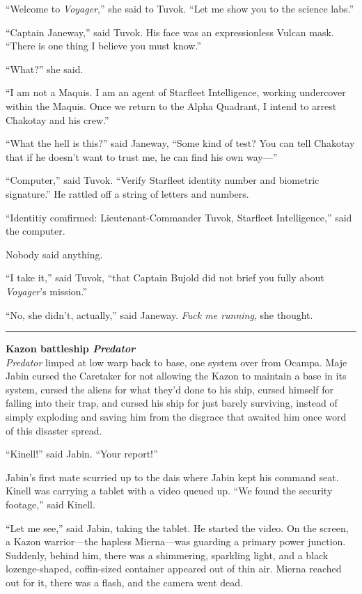 \documentclass[twoside,letterpaper,12pt]{memoir}
\begin{document}
``Welcome to \textit{Voyager},'' she said to Tuvok. ``Let me show you to the science labs.''

``Captain Janeway,'' said Tuvok. His face was an expressionless Vulcan mask. ``There is one thing I believe you must know.''

``What?'' she said.

``I am not a Maquis. I am an agent of Starfleet Intelligence, working undercover within the Maquis. Once we return to the Alpha Quadrant, I intend to arrest Chakotay and his crew.''

``What the hell is this?'' said Janeway, ``Some kind of test? You can tell Chakotay that if he doesn't want to trust me, he can find his own way---''

``Computer,'' said Tuvok. ``Verify Starfleet identity number and biometric signature.'' He rattled off a string of letters and numbers.

``Identitiy comfirmed: Lieutenant-Commander Tuvok, Starfleet Intelligence,'' said the computer.

Nobody said anything.

``I take it,'' said Tuvok, ``that Captain Bujold did not brief you fully about \textit{Voyager}'s mission.''

``No, she didn't, actually,'' said Janeway. \textit{Fuck me running}, she thought.

\fancybreak{\rule{3cm}{0.4 pt}}
\noindent\textbf{Kazon battleship \textit{Predator}}\\

\textit{Predator} limped at low warp back to base, one system over from Ocampa. Maje Jabin cursed the Caretaker for not allowing the Kazon to maintain a base in its system, cursed the aliens for what they'd done to his ship, cursed himself for falling into their trap, and cursed his ship for just barely surviving, instead of simply exploding and saving him from the disgrace that awaited him once word of this disaster spread.

``Kinell!'' said Jabin. ``Your report!''

Jabin's first mate scurried up to the dais where Jabin kept his command seat. Kinell was carrying a tablet with a video queued up. ``We found the security footage,'' said Kinell.

``Let me see,'' said Jabin, taking the tablet. He started the video. On the screen, a Kazon warrior---the hapless Mierna---was guarding a primary power junction. Suddenly, behind him, there was a shimmering, sparkling light, and a black lozenge-shaped, coffin-sized container appeared out of thin air. Mierna reached out for it, there was a flash, and the camera went dead.
\end{document}

